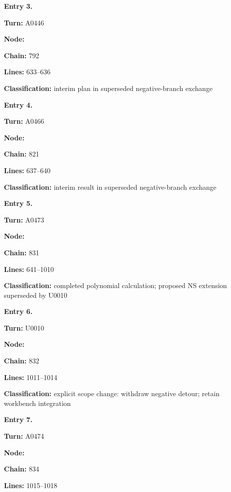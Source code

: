 \documentclass[10pt,a4paper,oneside]{report}
\begin{document}

\textbf{Entry 3.}

\textbf{Turn:} A0446

\textbf{Node:} \protect{}

\textbf{Chain:} 792

\textbf{Lines:} 633--636

\textbf{Classification:} interim plan in superseded negative-branch
exchange


\textbf{Entry 4.}

\textbf{Turn:} A0466

\textbf{Node:} \protect{}

\textbf{Chain:} 821

\textbf{Lines:} 637--640

\textbf{Classification:} interim result in superseded negative-branch
exchange


\textbf{Entry 5.}

\textbf{Turn:} A0473

\textbf{Node:} \protect{}

\textbf{Chain:} 831

\textbf{Lines:} 641--1010

\textbf{Classification:} completed polynomial calculation; proposed NS
extension superseded by U0010


\textbf{Entry 6.}

\textbf{Turn:} U0010

\textbf{Node:} \protect{}

\textbf{Chain:} 832

\textbf{Lines:} 1011--1014

\textbf{Classification:} explicit scope change: withdraw negative
detour; retain workbench integration


\textbf{Entry 7.}

\textbf{Turn:} A0474

\textbf{Node:} \protect{}

\textbf{Chain:} 834

\textbf{Lines:} 1015--1018
\end{document}
